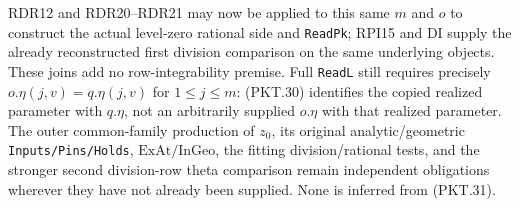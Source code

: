 RDR12 and RDR20--RDR21 may now be applied to this same $m$ and $o$ to
construct the actual level-zero rational side and \texttt{ReadPk};
RPI15 and DI supply the already reconstructed first division comparison
on the same underlying objects.  These joins add no row-integrability
premise.  Full \texttt{ReadL} still requires precisely
$o.\eta(j,v)=q.\eta(j,v)$ for $1\le j\le m$: (PKT.30) identifies the
copied realized parameter with $q.\eta$, not an arbitrarily supplied
$o.\eta$ with that realized parameter.  The outer common-family production
of $z_0$, its original analytic/geometric \texttt{Inputs/Pins/Holds},
$\mathrm{ExAt}/\mathrm{InGeo}$, the fitting division/rational tests,
and the stronger second division-row theta comparison remain independent
obligations wherever they have not already been supplied.  None is
inferred from (PKT.31).
